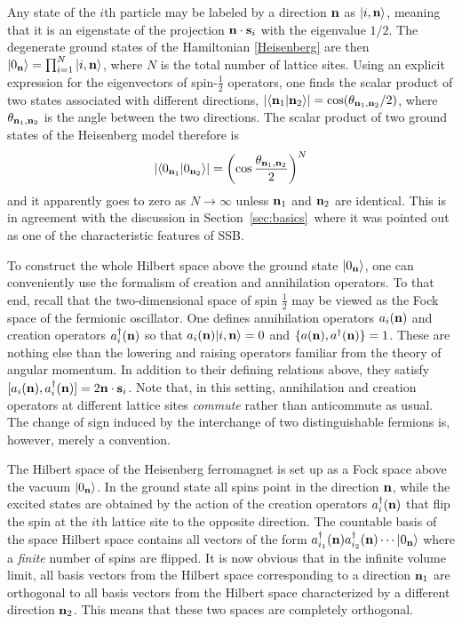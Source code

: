 \documentclass[final,3p,times,12pt,a4paper,sort&compress]{elsarticle}
\newcommand\vek[1]{{\boldsymbol{\bf #1}}}   %
\newcommand\skal[2]{\vek{#1}\cdot\vek{#2}}  %
\newcommand\ket[1]{\vert#1\rangle}          %
\newcommand\braket[2]{\langle#1\vert#2\rangle} %
\newcommand\he[1]{#1^{\dagger}}             %
\newcommand\vt{\theta}
\newcommand\abs[1]{\left|#1\right|}         %
\begin{document}
Any state of the $i$th particle may be labeled by a direction $\vek n$ as
$\ket{i,\vek n}$, meaning that it is an eigenstate of the projection $\skal
ns_i$ with the eigenvalue $1/2$. The degenerate ground states of the
Hamiltonian \eqref{Heisenberg} are then $\ket{0_{\vek
n}}=\prod_{i=1}^N\ket{i,\vek n}$, where $N$ is the total number of lattice
sites. Using an explicit expression for the eigenvectors of spin-$\frac12$
operators, one finds the scalar product of two states associated with different
directions, $\abs{\braket{\vek n_1}{\vek n_2}}=\cos(\vt_{\vek n_1,\vek n_2}/2)$,
where $\vt_{\vek n_1,\vek n_2}$ is the angle between the two directions. The
scalar product of two ground states of the Heisenberg model therefore is
\begin{equation}
\abs{\braket{0_{\vek n_1}}{0_{\vek n_2}}}=\left(\cos\frac{\vt_{\vek n_1,\vek
n_2}}2\right)^N
\end{equation}
and it apparently goes to zero as $N\to\infty$ unless $\vek n_1$ and $\vek n_2$
are identical. This is in agreement with the discussion in
Section~\ref{sec:basics}\ where it was pointed out as one of the characteristic
features of SSB.

To construct the whole Hilbert space above the ground state $\ket{0_{\vek n}}$,
one can conveniently use the formalism of creation and annihilation operators.
To that end, recall that the two-dimensional space of spin $\frac12$ may be
viewed as the Fock space of the fermionic oscillator. One defines annihilation
operators $a_i(\vek n)$ and creation operators $\he a_i(\vek n)$ so that
$a_i(\vek n)\ket{i,\vek n}=0$ and $\{a(\vek n),\he a(\vek n)\}=1$. These are
nothing else than the lowering and raising operators familiar from the theory
of angular momentum. In addition to their defining relations above, they
satisfy $[a_i(\vek n),\he a_i(\vek n)]=2\skal ns_i$. Note that, in this
setting, annihilation and creation operators at different lattice sites
\emph{commute} rather than anticommute as usual. The change of sign induced by
the interchange of two distinguishable fermions is, however, merely a
convention.

The Hilbert space of the Heisenberg ferromagnet is set up as a Fock space above
the vacuum $\ket{0_{\vek n}}$. In the ground state all spins point in the
direction $\vek n$, while the excited states are obtained by the action of the
creation operators $\he a_i(\vek n)$ that flip the spin at the $i$th lattice
site to the opposite direction. The countable basis of the space Hilbert space
contains all vectors of the form $\he a_{i_1}(\vek n)\he a_{i_2}(\vek
n)\dotsb\ket{0_{\vek n}}$ where a \emph{finite} number of spins are flipped. It
is now obvious that in the infinite volume limit, all basis vectors from the
Hilbert space corresponding to a direction $\vek n_1$ are orthogonal to all
basis vectors from the Hilbert space characterized by a different direction
$\vek n_2$. This means that these two spaces are completely orthogonal.
\end{document}
